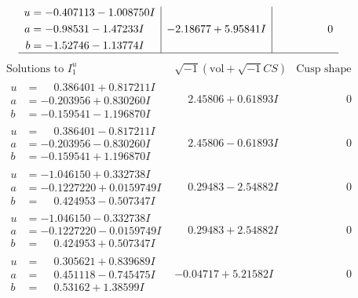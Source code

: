\documentclass[1p]{elsarticle_modified}
\theoremstyle{definition}
\newcommand{\I}{\sqrt{-1}}
\begin{document}
$$\begin{array}{c|c|c}
\begin{aligned}
u &= -0.407113 - 1.008750 I \\
a &= -0.98531 - 1.47233 I \\
b &= -1.52746 - 1.13774 I\end{aligned}
 & -2.18677 + 5.95841 I & \phantom{-0.000000 } 0\\
 \hline 
 \end{array}$$\newpage$$\begin{array}{c|c|c}  
\text{Solutions to }I^u_{1}& \I (\text{vol} + \sqrt{-1}CS) & \text{Cusp shape}\\
 \hline 
\begin{aligned}
u &= \phantom{-}0.386401 + 0.817211 I \\
a &= -0.203956 + 0.830260 I \\
b &= -0.159541 - 1.196870 I\end{aligned}
 & \phantom{-}2.45806 + 0.61893 I & \phantom{-0.000000 } 0 \\ \hline\begin{aligned}
u &= \phantom{-}0.386401 - 0.817211 I \\
a &= -0.203956 - 0.830260 I \\
b &= -0.159541 + 1.196870 I\end{aligned}
 & \phantom{-}2.45806 - 0.61893 I & \phantom{-0.000000 } 0 \\ \hline\begin{aligned}
u &= -1.046150 + 0.332738 I \\
a &= -0.1227220 + 0.0159749 I \\
b &= \phantom{-}0.424953 - 0.507347 I\end{aligned}
 & \phantom{-}0.29483 - 2.54882 I & \phantom{-0.000000 } 0 \\ \hline\begin{aligned}
u &= -1.046150 - 0.332738 I \\
a &= -0.1227220 - 0.0159749 I \\
b &= \phantom{-}0.424953 + 0.507347 I\end{aligned}
 & \phantom{-}0.29483 + 2.54882 I & \phantom{-0.000000 } 0 \\ \hline\begin{aligned}
u &= \phantom{-}0.305621 + 0.839689 I \\
a &= \phantom{-}0.451118 - 0.745475 I \\
b &= \phantom{-}0.53162 + 1.38599 I\end{aligned}
 & -0.04717 + 5.21582 I & \phantom{-0.000000 } 0 \\ \hline\begin{aligned}

\end{aligned}
\end{array}$$
\end{document}
